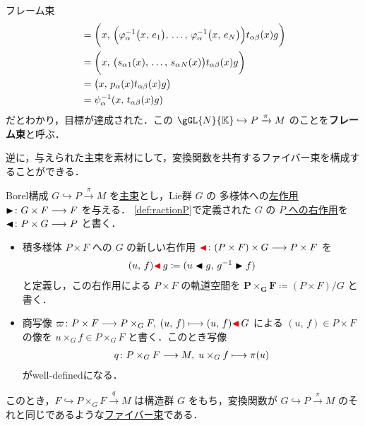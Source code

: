 \documentclass[geometry_main]{subfiles}
\begin{document}
\begin{myexample}[label=def:framebundle]{フレーム束}
\begin{align}
        &= \biggl(x,\, \Bigl(\varphi_\alpha^{-1}\bigl(x,\, e_1\bigr) ,\, \dots,\, \varphi_\alpha^{-1}\bigl(x,\, e_N\bigr)\Bigr) t_{\alpha\beta}(x)g\biggr) \\
        &= \biggl(x,\, \bigl(s_\alpha{}_{1}(x),\, \dots,\, s_\alpha{}_N(x)\bigr) t_{\alpha\beta}(x)g\biggr) \\
        &= \bigl(x,\, p_{\alpha} (x) t_{\alpha\beta}(x) g\bigr) \\
        &= \psi_\alpha^{-1} (x,\, t_{\alpha\beta}(x) g)
    \end{align}
    だとわかり，目標が達成された．この $\gGL{N}{\mathbb{K}} \hookrightarrow P \xrightarrow{\pi} M$ のことを\textbf{フレーム束}と呼ぶ．
\end{myexample}

逆に，与えられた主束を素材にして，変換関数を共有するファイバー束を構成することができる．

\begin{myprop}[label=prop:Borelconst,breakable]{Borel構成}
    $G \hookrightarrow P \xrightarrow{\pi} M$ を\hyperref[def.PFD]{主束}とし，Lie群 $G$ の \cinfty 多様体への\hyperref[def:Lie-action]{左作用} $\blacktriangleright \colon G \times F \longrightarrow F$ を与える．
    \eqref{def:ractionP}で定義された $G$ の \underline{$P$ への右作用}を $\blacktriangleleft \colon P \times G \longrightarrow P$ と書く．
    \begin{itemize}
        \item 積多様体 $P \times F$ への $G$ の新しい右作用 $\textcolor{red}{\blacktriangleleft} \colon (P \times F) \times G \longrightarrow P \times F$ を
        \begin{align}
            (u,\, f) \textcolor{red}{\blacktriangleleft}\, g \coloneqq (u \blacktriangleleft g,\, g^{-1} \blacktriangleright f)
        \end{align}
        と定義し，この右作用による $P \times F$ の軌道空間を $\bm{P \times_G F} \coloneqq (P \times F) / G$ と書く．
        \item 商写像 $\varpi\colon P \times F \longrightarrow P \times _G F,\; (u,\, f) \longmapsto (u,\, f) \textcolor{red}{\blacktriangleleft}\, G$ による $(u,\, f) \in P \times F$ の像を $u \times_G f \in P \times_G F$ と書く．このとき写像
        \begin{align}
            q \colon P \times_G F \longrightarrow M,\; u \times_G f \longmapsto \pi (u)
        \end{align}
        がwell-definedになる．
    \end{itemize}
    このとき，$F \hookrightarrow P \times_G F \xrightarrow{q} M$ は構造群 $G$ をもち，変換関数が $G \hookrightarrow P \xrightarrow{\pi} M$ のそれと同じであるような\hyperref[def.fiber-1]{ファイバー束}である．
\end{myprop}
\end{document}
